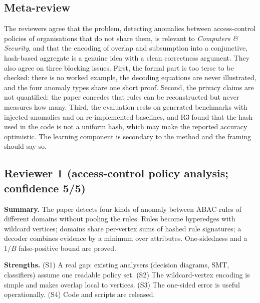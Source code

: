\documentclass[11pt,a4paper]{article}
\begin{document}
\subsection*{Meta-review}
The reviewers agree that the problem, detecting anomalies between access-control policies of organisations that do not share them, is relevant to \emph{Computers \& Security}, and that the encoding of overlap and subsumption into a conjunctive, hash-based aggregate is a genuine idea with a clean correctness argument. They also agree on three blocking issues. First, the formal part is too terse to be checked: there is no worked example, the decoding equations are never illustrated, and the four anomaly types share one short proof. Second, the privacy claims are not quantified: the paper concedes that rules can be reconstructed but never measures how many. Third, the evaluation rests on generated benchmarks with injected anomalies and on re-implemented baselines, and R3 found that the hash used in the code is not a uniform hash, which may make the reported accuracy optimistic. The learning component is secondary to the method and the framing should say so.

\subsection*{Reviewer 1 (access-control policy analysis; confidence 5/5)}
\textbf{Summary.} The paper detects four kinds of anomaly between ABAC rules of different domains without pooling the rules. Rules become hyperedges with wildcard vertices; domains share per-vertex sums of hashed rule signatures; a decoder combines evidence by a minimum over attributes. One-sidedness and a $1/B$ false-positive bound are proved.

\textbf{Strengths.} (S1) A real gap: existing analysers (decision diagrams, SMT, classifiers) assume one readable policy set. (S2) The wildcard-vertex encoding is simple and makes overlap local to vertices. (S3) The one-sided error is useful operationally. (S4) Code and scripts are released.
\end{document}

